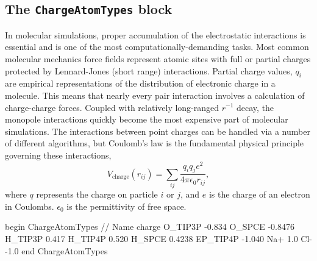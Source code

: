 \documentclass[letterpaper]{report}
\begin{document}
\subsection{\label{section:ffCharge}The {\tt ChargeAtomTypes} block}

In molecular simulations, proper accumulation of the electrostatic
interactions is essential and is one of the most
computationally-demanding tasks.  Most common molecular mechanics
force fields represent atomic sites with full or partial charges
protected by Lennard-Jones (short range) interactions.  Partial charge
values, $q_i$ are empirical representations of the distribution of
electronic charge in a molecule.  This means that nearly every pair
interaction involves a calculation of charge-charge forces.  Coupled
with relatively long-ranged $r^{-1}$ decay, the monopole interactions
quickly become the most expensive part of molecular simulations.  The
interactions between point charges can be handled via a number of
different algorithms, but Coulomb's law is the fundamental physical
principle governing these interactions,
\begin{equation}
  V_{\text{charge}}(r_{ij}) = \sum_{ij}\frac{q_iq_je^2}{4 \pi \epsilon_0
    r_{ij}}, 
\end{equation}
where $q$ represents the charge on particle $i$ or $j$, and $e$ is the
charge of an electron in Coulombs.  $\epsilon_0$ is the permittivity
of free space.

\begin{code}[caption={[An example of a ChargeAtomTypes block.] A
simple example of a ChargeAtomTypes block.   Units for
charge are in multiples of electron charge.},
label={sch:ChargeAtomTypesBlock}]
begin ChargeAtomTypes
// Name         charge
O_TIP3P        -0.834
O_SPCE         -0.8476
H_TIP3P         0.417
H_TIP4P         0.520
H_SPCE          0.4238
EP_TIP4P       -1.040
Na+             1.0
Cl-            -1.0
end ChargeAtomTypes
\end{code}
\end{document}
